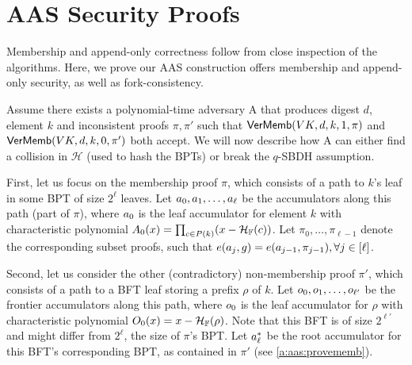\section{AAS Security Proofs}
\label{s:aas:proofs}
Membership and append-only correctness follow from close inspection of the algorithms. 
Here, we prove our AAS construction offers membership and append-only security, as well as fork-consistency.

\label{s:aas:proofs:membership-security}
Assume there exists a polynomial-time adversary \textsf{A} that produces digest $d$, element $k$ and inconsistent proofs $\pi,\pi'$ such that $\mathsf{VerMemb}(VK,d,k,1,\pi)$ and $\mathsf{VerMemb}(VK,d,k,0,\pi')$ both accept. 
We will now describe how \textsf{A} can either find a collision in $\mathcal{H}$ (used to hash the BPTs) or break the $q$-SBDH assumption.

\begingroup
\renewcommand{\myblue}[1]{\textcolor{black}{#1}}
\renewcommand{\mathbf}[1]{#1}
\renewcommand{\boldsymbol}[1]{#1}

First, let us focus on the membership proof $\pi$, which consists of a path to $k$'s leaf in some BPT of size $2^\ell$ leaves.
Let $\acc_0,\acc_1,\dots,\acc_{\ell}$ be the accumulators along this path (part of $\pi$), where $\acc_0$ is the leaf accumulator for element $k$ with characteristic polynomial $A_0(x) = \prod_{c \in P(k)}(x-\mathcal{H}_{\mathbb{F}}(c))$.
Let $\pi_0, \dots, \pi_{\ell-1}$ denote the corresponding subset proofs, such that $e(\acc_j, g) = e(\acc_{j-1}, \pi_{j-1}), \forall j \in [\ell]$.

Second, let us consider the other (contradictory) non-membership proof $\pi'$, which consists of a path to a BFT leaf storing a prefix $\rho$ of $k$.
Let $o_0, o_1,\dots,o_{\ell'}$ be the frontier accumulators along this path, where $o_0$ is the leaf accumulator for $\rho$ with characteristic polynomial $O_0(x) = x-\mathcal{H}_{\mathbb{F}}(\rho)$.
Note that this BFT is of size $2^{\ell'}$ and might differ from $2^\ell$, the size of $\pi$'s BPT.
Let $\acc^*_\ell$ be the root accumulator for this BFT's corresponding BPT, as contained in $\pi'$ (see \cref{a:aas:provememb}).

